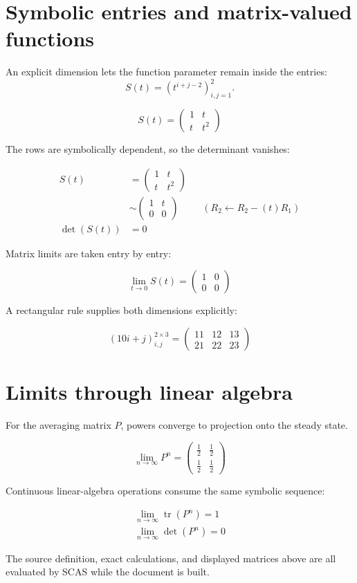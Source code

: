 \documentclass[11pt]{article}
\begin{document}
\section*{Symbolic entries and matrix-valued functions}
An explicit dimension lets the function parameter remain inside the entries:
\[S(t)=\left(t^{i+j-2}\right)_{i,j=1}^{2}.\]

\[S\left(t\right) = \begin{pmatrix}1 & t \\ t & t^{2}\end{pmatrix}\]

The rows are symbolically dependent, so the determinant vanishes:

\[\begin{aligned}S\left(t\right) &= \begin{pmatrix}1 & t \\ t & t^{2}\end{pmatrix} \\
&\sim \begin{pmatrix}1 & t \\ 0 & 0\end{pmatrix} && \left(R_{2}\leftarrow R_{2}-\left(t\right)R_{1}\right) \\
\det\left(S\left(t\right)\right) &= 0\end{aligned}\]

Matrix limits are taken entry by entry:

\[\lim_{t\to 0} S\left(t\right) = \begin{pmatrix}1 & 0 \\ 0 & 0\end{pmatrix}\]

A rectangular rule supplies both dimensions explicitly:

\[\left(10i + j\right)_{i,j}^{2\times3} = \begin{pmatrix}11 & 12 & 13 \\ 21 & 22 & 23\end{pmatrix}\]

\section*{Limits through linear algebra}
For the averaging matrix \(P\), powers converge to projection onto the steady state.

\[\lim_{n\to \infty} P^{n} = \begin{pmatrix}\frac{1}{2} & \frac{1}{2} \\ \frac{1}{2} & \frac{1}{2}\end{pmatrix}\]

Continuous linear-algebra operations consume the same symbolic sequence:

\begin{align*}\lim_{n\to \infty} \operatorname{tr}\left(P^{n}\right) = 1 \\
\lim_{n\to \infty} \det\left(P^{n}\right) = 0\end{align*}

The source definition, exact calculations, and displayed matrices above are all evaluated by SCAS while the document is built.
\end{document}
